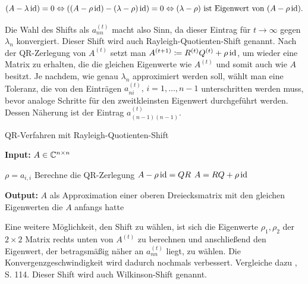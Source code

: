 \documentclass{article}
\begin{document}
\begin{equation*}
	(A - \lambda \operatorname{id}) = 0 \Leftrightarrow ((A - \rho \operatorname{id}) - (\lambda -\rho) \operatorname{id}) = 0 \Leftrightarrow (\lambda-\rho) \text{ ist Eigenwert von }  (A - \rho \operatorname{id}).
\end{equation*}

Die Wahl des Shifts als $a^{(t)}_{nn}$ macht also Sinn, da dieser Eintrag für $t \rightarrow \infty$ gegen $\lambda_n$ konvergiert. Dieser Shift wird auch Rayleigh-Quotienten-Shift genannt. Nach der QR-Zerlegung von $A^{(t)}$ setzt man $A^{(t+1)} \coloneqq R^{(t)}Q^{(t)} + \rho \operatorname{id}$, um wieder eine Matrix zu erhalten, die die gleichen Eigenwerte wie $A^{(t)}$ und somit auch wie $A$ besitzt.
Je nachdem, wie genau $\lambda_n$ approximiert werden soll, wählt man eine Toleranz, die von den Einträgen $a^{(t)}_{ni}, \, i = 1,\dots, n-1$ unterschritten werden muss, bevor analoge Schritte für den zweitkleinsten Eigenwert durchgeführt werden. Dessen Näherung ist der Eintrag $a^{(t)}_{(n-1)(n-1)}$.

\renewcommand{\algorithmicrequire}{\textbf{Input:}}
\renewcommand{\algorithmicensure}{\textbf{Output:}}

\begin{algorithm}

	\caption{QR-Verfahren mit Rayleigh-Quotienten-Shift}
	\label{QR-Verfahren_shifts_rayleigh}
	\algorithmicrequire{ $A \in \mathbb{C}^{n\times n}$}
	\begin{algorithmic}[1]
				\State $\rho = a_{i,i}$
				\State Berechne die QR-Zerlegung $A - \rho \operatorname{id} = QR$
				\State $A = RQ + \rho \operatorname{id}$
			\EndWhile
		\EndFor
	\end{algorithmic}
	\algorithmicensure{ $A$ als Approximation einer oberen Dreiecksmatrix mit den gleichen Eigenwerten die $A$ anfangs hatte}
\end{algorithm}

Eine weitere Möglichkeit, den Shift zu wählen, ist sich die Eigenwerte $\rho_1, \rho_2$ der $2 \times 2$ Matrix rechts unten von $A^{(t)}$ zu berechnen und anschließend den Eigenwert, der betragsmäßig näher an $a^{(t)}_{nn}$ liegt, zu wählen. Die Konvergenzgeschwindigkeit wird dadurch nochmals verbessert. Vergleiche dazu \cite{Num}, S. 114. Dieser Shift wird auch Wilkinson-Shift genannt.
\end{document}
